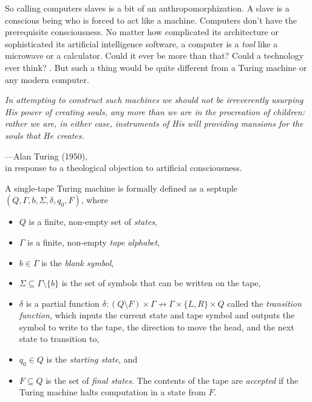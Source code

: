 \begin{tcolorbox}[breakable, enhanced, colback=textbook-blue, sharp corners]
	So calling computers slaves is a bit of an anthropomorphization. A slave is a conscious being who is forced to act like a machine. Computers don't have the prerequisite consciousness. No matter how complicated its architecture or sophisticated its artificial intelligence software, a computer is a \textit{tool} like a microwave or a calculator. Could it ever be more than that? Could a technology ever think? . But such a thing would be quite different from a Turing machine or any modern computer. \\
	
	\parbreak
	\vspace{1mm}
	
	\begin{displayquote}
		\textit{In attempting to construct such machines we should not be irreverently usurping His power of creating souls, any more than we are in the procreation of children: rather we are, in either case, instruments of His will providing mansions for the souls that He creates.}
		\vspace{4mm}
		\begin{flushright}
			---Alan Turing (1950), \\
			in response to a theological objection to artificial consciousness.
		\end{flushright}
	\end{displayquote}
	\vspace{3mm}
\end{tcolorbox}
\vspace{2\baselineskip}

A single-tape Turing machine is formally defined as a septuple $(Q,\Gamma,b,\Sigma,\delta,q_0,F)$, where

\begin{itemize}
	\item $Q$ is a finite, non-empty set of \textit{states},
	\item $\Gamma$ is a finite, non-empty \textit{tape alphabet},
	\item $b\in\Gamma$ is the \textit{blank symbol},
	\item $\Sigma\subseteq\Gamma\setminus \{b\}$ is the set of symbols that can be written on the tape,
	\item $\delta$ is a partial function $\delta : (Q\setminus F)\times\Gamma\nrightarrow \Gamma\times\{L,R\}\times Q$ called the \textit{transition function}, which inputs the current state and tape symbol and outputs the symbol to write to the tape, the direction to move the head, and the next state to transition to,
	\item $q_0\in Q$ is the \textit{starting state}, and
	\item $F\subseteq Q$ is the set of \textit{final states}. The contents of the tape are \textit{accepted} if the Turing machine halts computation in a state from $F$.
\end{itemize}

